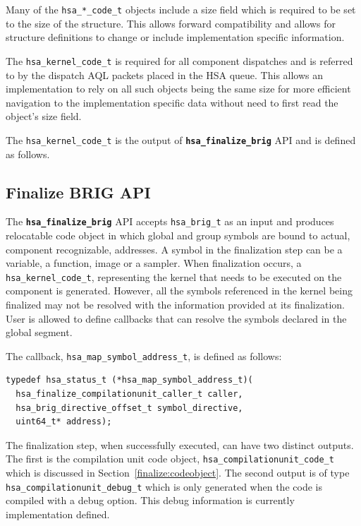 \documentclass{book}
\newcommand{\diffblock}[1]{#1}
\newcommand{\ttbf}[1]{\diffblock{\texttt{\textbf{#1}}}}
\begin{document}
\begin{appendices}
Many of the \texttt{hsa\_*\_code\_t} objects include a size field
which is required to be set to the size of the structure. This
allows forward compatibility and allows for structure definitions to
change or include implementation specific information.

The \texttt{hsa\_kernel\_code\_t} is required for all component
dispatches and is referred to by the dispatch AQL packets placed in
the HSA queue. This allows an implementation to rely on all such
objects being the same size for more efficient navigation to the
implementation specific data without need to first read the object's
size field.

The \texttt{hsa\_kernel\_code\_t} is the output of
\ttbf{hsa\_finalize\_brig} API and is defined as follows.



\subsection{Finalize BRIG API}
The \ttbf{hsa\_finalize\_brig} API accepts \texttt{hsa\_brig\_t} as
an input and produces relocatable code object in which global and
group symbols are bound to actual, component recognizable,
addresses.  A symbol in the finalization step can be a variable, a
function, image or a sampler. When finalization occurs, a
\texttt{hsa\_kernel\_code\_t}, representing the kernel that needs to
be executed on the component is generated.  However, all the symbols
referenced in the kernel being finalized may not be resolved with
the information provided at its finalization. User is allowed to
define callbacks that can resolve the symbols declared in the global
segment.

The callback, \texttt{hsa\_map\_symbol\_address\_t}, is defined as
follows:
\begin{lstlisting}
typedef hsa_status_t (*hsa_map_symbol_address_t)(
  hsa_finalize_compilationunit_caller_t caller,
  hsa_brig_directive_offset_t symbol_directive,
  uint64_t* address);
\end{lstlisting}

The finalization step, when successfully executed, can have two
distinct outputs. The first is the compilation unit code object,
\texttt{hsa\_compilationunit\_code\_t} which is discussed in
Section~\ref{finalize:codeobject}. The second output is of type
\texttt{hsa\_compilationunit\_debug\_t} which is only generated when
the code is compiled with a debug option. This debug information is
currently implementation defined.


\end{appendices}
\end{document}
